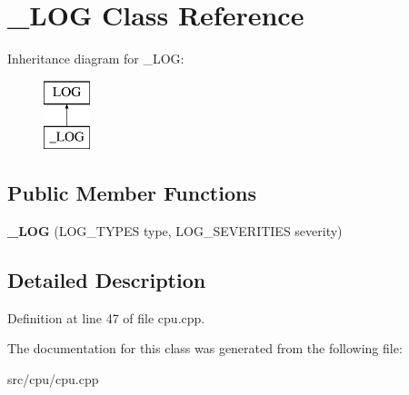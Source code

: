 \hypertarget{class__LOG}{\section{\-\_\-\-L\-O\-G Class Reference}
\label{class__LOG}
}
Inheritance diagram for \-\_\-\-L\-O\-G\-:\begin{figure}[H]
\begin{center}
\leavevmode
\includegraphics[height=2.000000cm]{class__LOG}
\end{center}
\end{figure}
\subsection*{Public Member Functions}
\begin{DoxyCompactItemize}
\item 
\hypertarget{class__LOG_ab6d547f5964f90ac3e7dbbb4cbf46713}{{\bfseries \-\_\-\-L\-O\-G} (L\-O\-G\-\_\-\-T\-Y\-P\-E\-S type, L\-O\-G\-\_\-\-S\-E\-V\-E\-R\-I\-T\-I\-E\-S severity)}\label{class__LOG_ab6d547f5964f90ac3e7dbbb4cbf46713}

\end{DoxyCompactItemize}


\subsection{Detailed Description}


Definition at line 47 of file cpu.\-cpp.



The documentation for this class was generated from the following file\-:\begin{DoxyCompactItemize}
\item 
src/cpu/cpu.\-cpp\end{DoxyCompactItemize}
